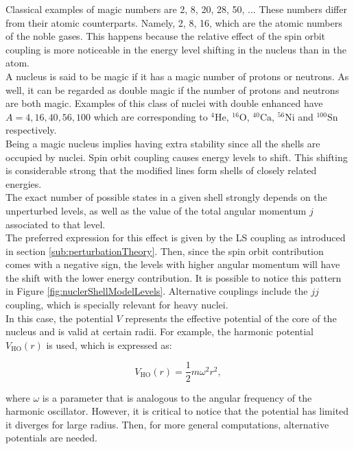 \documentclass[openany]{book}
\begin{document}
Classical examples of magic numbers are 2, 8, 20, 28, 50, ... These numbers differ from their atomic counterparts. Namely, 2, 8, 16, which are the atomic numbers of the noble gases. This happens because the relative effect of the spin orbit coupling is more noticeable in the energy level shifting in the nucleus than in the atom.\\


A nucleus is said to be magic if it has a magic number of protons or neutrons. As well, it can be regarded as double magic if the number of protons and neutrons are both magic. Examples of this class of nuclei with double enhanced have $A = 4, 16, 40, 56, 100$ which are corresponding to $\mathrm{{}^{4}He}$, $\mathrm{{}^{16}O}$,  $\mathrm{{}^{40}Ca}$, $\mathrm{{}^{56}Ni}$ and $\mathrm{{}^{100}Sn}$ respectively. \\

Being a magic nucleus implies having extra stability since all the shells are occupied by nuclei.  Spin orbit coupling causes energy levels to shift. This shifting is considerable strong that the modified lines form shells of closely related energies.  \\

The exact number of possible states in a given shell strongly depends on the unperturbed levels, as well as the value of the total angular momentum $j$ associated to that level.  \\

The preferred expression for this effect is given by the LS coupling as introduced in section \ref{sub:perturbationTheory}. Then, since the spin orbit contribution comes with a negative sign, the levels with higher angular momentum will have the shift with the lower energy contribution. It is possible to notice this pattern in Figure \ref{fig:nuclerShellModelLevels}. Alternative couplings include the $jj$ coupling, which is specially relevant for heavy nuclei. \\

In this case, the potential $V$ represents the effective potential of the core of the nucleus and is valid at certain radii. For example, the harmonic potential $V_{\mathrm{HO}}(r)$ is used, which is expressed as: 


\begin{equation} \label{eq:nuclearShell_harmonicOscillator}
	V_{\mathrm{HO}}(r) = \frac{1}{2}m\omega^2r^2,
\end{equation}

where $\omega$ is a parameter that is analogous to the angular frequency of the harmonic oscillator. However, it is critical to notice that the potential has limited it diverges for large radius. Then, for more general computations, alternative potentials are needed.  \\
\end{document}
